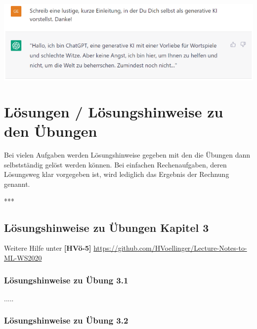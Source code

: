 \documentclass[12pt]{article}
\begin{document}
\begin{center}
\includegraphics{ChatGPT-Text1} 
\end{center}


\newpage

\section{Lösungen / Lösungshinweise zu den Übungen \\}

Bei vielen Aufgaben werden Lösungshinweise gegeben mit den die Übungen dann selbstständig gelöst werden können. Bei einfachen Rechenaufgaben, deren Lösungsweg klar vorgegeben ist, wird lediglich das Ergebnis der Rechnung genannt.\\
{\color{red}{*******************************************************************\\ ab hier bis Ende der Hinweise sind die Folien der Vorlesung ML  zu nutzen und diese sind in Latex umzusetzen\\
********************************************************************\\}}



***\\
\subsection{Lösungshinweise zu Übungen Kapitel 3}

\hspace*{-1.8cm} Weitere Hilfe unter \textbf{[HVö-5]} \url{https://github.com/HVoellinger/Lecture-Notes-to-ML-WS2020}\\


\subsubsection{Lösungshinweise zu Übung 3.1}


.....\\

\subsubsection{Lösungshinweise zu Übung 3.2} 
\end{document}
